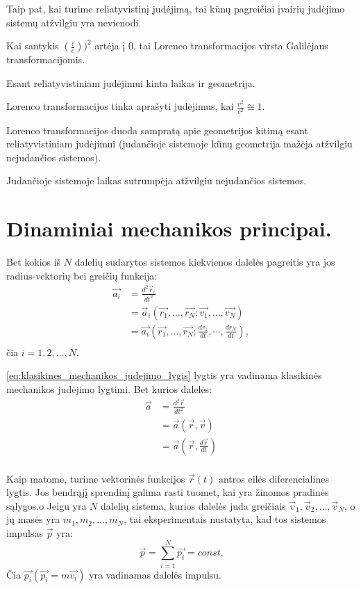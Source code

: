 Taip pat, kai turime reliatyvistinį judėjimą, tai kūnų pagreičiai
įvairių judėjimo sistemų atžvilgiu yra nevienodi.

Kai santykis $\left( \frac{v}{c} \right))^{2}$ artėja į 0, tai
Lorenco transformacijos virsta Galilėjaus transformacijomis.

\begin{remember}
  \item Esant reliatyvistiniam judėjimui kinta laikas ir geometrija.
  \item Lorenco transformacijos tinka aprašyti judėjimus, kai
    $\frac{v^{2}}{c^{2}} \cong 1$.
  \item Lorenco transformacijos duoda sampratą apie geometrijos
    kitimą esant reliatyvistiniam judėjimui (judančioje sistemoje
    kūnų geometrija mažėja atžvilgiu nejudančios sistemos).
  \item Judančioje sistemoje laikas sutrumpėja atžvilgiu
    nejudančios sistemos.
\end{remember}

\section{Dinaminiai mechanikos principai.}

Bet kokios iš $N$ dalelių sudarytos sistemos kiekvienos dalelės
pagreitis yra jos radius-vektorių bei greičių funkcija:
\begin{align}
  \vec{a_{i}}
  &= \frac{d^{2}\vec{r}_{i}}{dt^{2}} \\
  &= \vec{a}_{i}(%
    \vec{r_{1}},\ldots,\vec{r_{N}}; \vec{v_{1}},\ldots,\vec{v_{N}}) \\
  &= \vec{a_{i}} \left(%
    \vec{r_{1}},\ldots,\vec{r_{N}}; %
    \frac{dr_{1}}{dt},\cdots,\frac{dr_{N}}{dt} \right), \\
  \label{eq:klasikines_mechanikos_judejimo_lygis}
\end{align}
čia $i = 1,2,\ldots,N$.

\ref{eq:klasikines_mechanikos_judejimo_lygis} lygtis yra vadinama
klasikinės mechanikos judėjimo lygtimi. Bet kurios dalelės:
\begin{align*}
  \vec{a}
  &= \frac{d^{2}\vec{r}}{dt^{2}} \\
  &= \vec{a}(\vec{r}, \vec{v}) \\
  &= \vec{a} (\vec{r}, \frac{d\vec{r}}{dt}) \\
\end{align*}

Kaip matome, turime vektorinės funkcijos $\vec{r}(t)$ antros eilės
diferencialines lygtis. Jos bendrąjį sprendinį galima rasti tuomet,
kai yra žinomos pradinės sąlygos.o
Jeigu yra $N$ dalelių sistema, kurios dalelės juda greičiais
$\vec{v}_{1}, \vec{v}_{2}, \ldots, \vec{v}_{N}$, o jų masės yra
$m_{1}, m_{2}, \ldots, m_{N}$, tai eksperimentais nustatyta, kad
tos sistemos impulsas $\vec{p}$ yra:
\begin{equation*}
  \vec{p} = \sum ^{N} _{i = 1} \vec{p_{i}} = const.
\end{equation*}
Čia $\vec{p_{i}} (\vec{p_{i}} = m \vec{v_{i}})$ yra vadinamas
dalelės impulsu.

